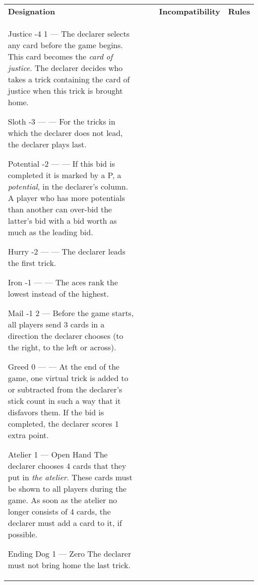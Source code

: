 	\begin{center}
		\begin{tabularx}{\textwidth}{
			l
			S[table-number-alignment=center, table-format=1.0]
			S[table-number-alignment=center, table-format=1.0]
			p{3cm}
			|X
		}
			\textbf{Designation} &
			 &
			 &
			\textbf{Incompatibility} &
			\textbf{Rules}
			\\[-3ex]

			\specialBidItem%
			{Justice}
			{-4}
			{1}
			{---}
			{%
				The declarer selects any card before the game begins. This card becomes the \emph{card of justice}. The declarer decides who takes a trick containing the card of justice when this trick is brought home.
			}

			\specialBidItem%
			{Sloth}
			{-3}
			{{---}}
			{---}
			{%
				For the tricks in which the declarer does not lead, the declarer plays last.
			}

			\specialBidItem%
			{Potential}
			{-2}
			{{---}}
			{---}
			{%
				If this bid is completed it is marked by a P, a \emph{potential}, in the declarer's column. A player who has more potentials than another can over-bid the latter's bid with a bid worth as much as the leading bid.
			}

			\specialBidItem%
			{Hurry}
			{-2}
			{{---}}
			{---}
			{%
				The declarer leads the first trick.
			}

			\specialBidItem%
			{Iron}
			{-1}
			{{---}}
			{---}
			{%
				The aces rank the lowest instead of the highest.
			}

			\specialBidItem%
			{Mail}
			{-1}
			{2}
			{---}
			{%
				Before the game starts, all players send 3 cards in a direction the declarer chooses (to the right, to the left or across).
			}

			\specialBidItem%
			{Greed}
			{0}
			{{---}}
			{---}
			{%
				At the end of the game, one virtual trick is added to or subtracted from the declarer's stick count in such a way that it disfavors them. If the bid is completed, the declarer scores 1 extra point.
			}

			\specialBidItem%
			{Atelier}
			{1}
			{{---}}
			{Open Hand}
			{%
				The declarer chooses 4 cards that they put in \emph{the atelier}. These cards must be shown to all players during the game. As soon as the atelier no longer consists of 4 cards, the declarer must add a card to it, if possible.
			}

			\specialBidItem%
			{Ending Dog}
			{1}
			{{---}}
			{Zero}
			{%
				The declarer must not bring home the last trick.
			}


\end{tabularx}
\end{center}

